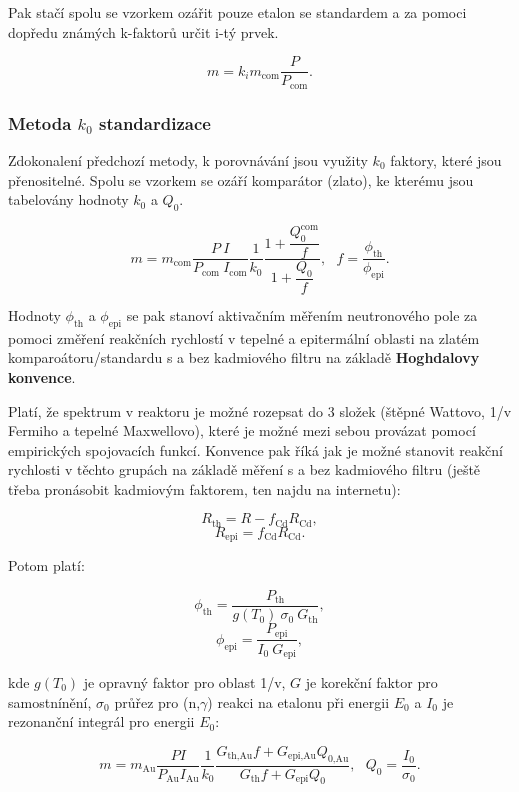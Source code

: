Pak stačí spolu se vzorkem ozářit pouze etalon se standardem a za pomoci dopředu známých k-faktorů určit i-tý prvek.

\begin{equation}
    \boxed{
        m = k_i m_\text{com} \dfrac{P}{P_\text{com}}.
    }
\end{equation}

\subsubsection{Metoda $k_0$ standardizace}

Zdokonalení předchozí metody, k porovnávání jsou využity $k_0$ faktory, které jsou přenositelné. Spolu se vzorkem se ozáří komparátor (zlato), ke kterému jsou tabelovány hodnoty $k_0$ a $Q_0$.

\begin{equation}
    \boxed{
        m = m_\text{com} \dfrac{P \: I}{P_\text{com} \: I_\text{com}} \dfrac{1}{k_0} \dfrac{1 + \dfrac{Q_0^\text{com}}{f}}{1 + \dfrac{Q_0}{f}}, \: \: \: f = \dfrac{\phi_\text{th}}{\phi_\text{epi}}.
    }
\end{equation}

Hodnoty $\phi_\text{th}$ a $\phi_\text{epi}$ se pak stanoví aktivačním měřením neutronového pole za pomoci změření reakčních rychlostí v tepelné a epitermální oblasti na zlatém komparoátoru/standardu s a bez kadmiového filtru na základě \textbf{Hoghdalovy konvence}.

Platí, že spektrum v reaktoru je možné rozepsat do 3 složek (štěpné Wattovo, 1/v Fermiho a tepelné Maxwellovo), které je možné mezi sebou provázat pomocí empirických spojovacích funkcí. Konvence pak říká jak je možné stanovit reakční rychlosti v těchto grupách na základě měření s a bez kadmiového filtru (ještě třeba pronásobit kadmiovým faktorem, ten najdu na internetu):

$$ R_\text{th} = R - f_\text{Cd}R_\text{Cd}, $$
$$ R_\text{epi} = f_\text{Cd}R_\text{Cd}. $$

Potom platí:

$$ \phi_\text{th} = \dfrac{P_\text{th}}{g(T_0) \: \sigma_0 \: G_\text{th}}, $$
$$ \phi_\text{epi} = \dfrac{P_\text{epi}}{I_0 \: G_\text{epi}}, $$

kde $g(T_0)$ je opravný faktor pro oblast 1/v, $G$ je korekční faktor pro samostnínění, $\sigma_0$ průřez pro (n,$\gamma$) reakci na etalonu při energii $E_0$ a $I_0$ je rezonanční integrál pro energii $E_0$:

\begin{equation}
    \boxed{
        m = m_\text{Au} \dfrac{P I}{P_\text{Au} I_\text{Au}} \dfrac{1}{k_0} \dfrac{G_\text{th,Au} f + G_\text{epi,Au} Q_{0\text{,Au}}}{G_\text{th} f + G_\text{epi} Q_{0}}, \: \: \: Q_0 = \dfrac{I_0}{\sigma_0}.
    }
\end{equation}

